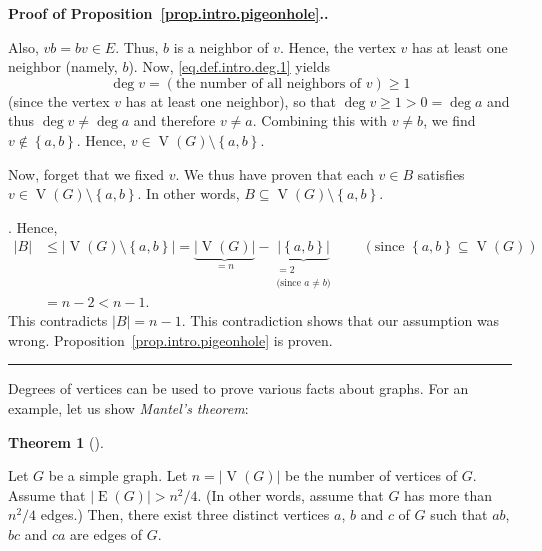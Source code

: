 \documentclass[numbers=enddot,12pt,final,onecolumn,notitlepage]{scrartcl}%
\theoremstyle{definition}
\newtheorem{theo}{Theorem}[subsection]
\newenvironment{theorem}[1][]
{\begin{theo}[#1]\begin{leftbar}}
{\end{leftbar}\end{theo}}
\newenvironment{proof}[1][Proof]{\noindent\textbf{#1.} }{\ \rule{0.5em}{0.5em}}
\newcommand{\set}[1]{\left\{ #1 \right\}}
\newcommand{\abs}[1]{\left| #1 \right|}
\newcommand{\verts}[1]{\operatorname{V}\left( #1 \right)}
\newcommand{\edges}[1]{\operatorname{E}\left( #1 \right)}
\newcommand{\underbrack}[2]{\underbrace{#1}_{\substack{#2}}}
\begin{document}
\begin{proof}[Proof of Proposition~\ref{prop.intro.pigeonhole}.]
{Also, $vb = bv \in E$. Thus, $b$ is a neighbor of $v$. Hence, the
vertex $v$ has at least one neighbor (namely, $b$).
Now, \eqref{eq.def.intro.deg.1} yields
\[
\deg v = \left(\text{the number of all neighbors of } v\right)
\geq 1
\]
(since the vertex $v$ has at least one neighbor), so that
$\deg v \geq 1 > 0 = \deg a$ and thus $\deg v \neq \deg a$ and
therefore $v \neq a$. Combining this with $v \neq b$, we find
$v \notin \set{a, b}$. Hence, $v \in \verts{G} \setminus \set{a, b}$.

Now, forget that we fixed $v$. We thus have proven that each $v \in B$
satisfies $v \in \verts{G} \setminus \set{a, b}$. In other words,
$B \subseteq \verts{G} \setminus \set{a, b}$.}. Hence,
\begin{align*}
\abs{B} &\leq \abs{\verts{G} \setminus \set{a, b}}
= \underbrace{\abs{\verts{G}}}_{= n}
- \underbrack{\abs{\set{a, b}}}{
                = 2 \\ \text{(since } a \neq b \text{)}}
\qquad \left(\text{since } \set{a, b} \subseteq \verts{G} \right) \\
&= n - 2 < n - 1 .
\end{align*}
This contradicts $\abs{B} = n - 1$. This contradiction shows that our
assumption was wrong. Proposition~\ref{prop.intro.pigeonhole} is
proven.
\end{proof}

Degrees of vertices can be used to prove various facts about graphs.
For an example, let us show \textit{Mantel's theorem}:

\begin{theorem} \label{thm.intro.mantel}
Let $G$ be a simple graph. Let $n = \abs{\verts{G}}$ be the number of
vertices of $G$. Assume that $\abs{\edges{G}} > n^2 / 4$. (In other
words, assume that $G$ has more than $n^2 / 4$ edges.) Then, there
exist three distinct vertices $a$,
$b$ and $c$ of $G$ such that $ab$, $bc$ and $ca$ are edges of $G$.
\end{theorem}
\end{document}
